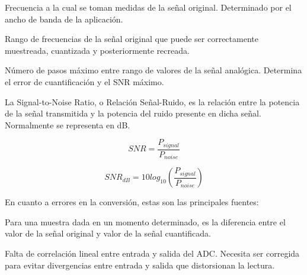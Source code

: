\documentclass[12pt]{report} %
\begin{document}
	\begin{description}[font=\bfseries, style=multiline, align=left, before={\renewcommand\makelabel[1]{\bfseries ##1:}}]
		\item[Frecuencia de muestreo] Frecuencia a la cual se toman medidas de la señal original. Determinado por el ancho de banda de la aplicación.
		\item[Ancho de banda] Rango de frecuencias de la señal original que puede ser correctamente muestreada, cuantizada y posteriormente recreada. 
		\item[Resolución] Número de pasos máximo entre rango de valores de la señal analógica. Determina el error de cuantificación y el SNR máximo.
		\item[SNR] La Signal-to-Noise Ratio, o Relación Señal-Ruido, es la relación entre la potencia de la señal transmitida y la potencia del ruido presente en dicha señal. Normalmente se representa en dB. 
			\begin{figure}[H]
				\begin{equation}
					\label{snr}
					SNR = \frac{P_{signal}}{P_{noise}}
				\end{equation}
			\end{figure}
			\begin{figure}[H]
				\begin{equation}
					\label{snr-db}
					SNR_{dB} = 10 log_{10} (\frac{P_{signal}}{P_{noise}})
				\end{equation}
			\end{figure}
					
	\end{description}

	En cuanto a errores en la conversión, estas son las principales fuentes:
	
	\begin{description}[font=\bfseries, style=multiline, align=left, before={\renewcommand\makelabel[1]{\bfseries ##1:}}]
		\item[Cuantificación] Para una muestra dada en un momento determinado, es la diferencia entre el valor de la señal original y valor de la señal cuantificada.
		\item[Linealidad] Falta de correlación lineal entre entrada y salida del ADC. Necesita ser corregida para evitar divergencias entre entrada y salida que distorsionan la lectura.
	\end{description}
\end{document}
